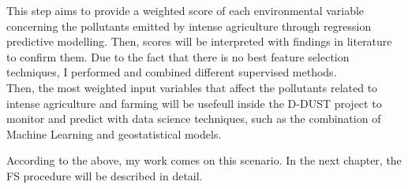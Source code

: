 \bigbreak
This step aims to provide a weighted score of each environmental variable concerning the pollutants emitted by intense agriculture through regression predictive modelling. Then, scores will be interpreted with findings in literature to confirm them.
Due to the fact that there is no best feature selection techniques, I performed and combined different supervised methods. \\
Then, the most weighted input variables that affect the pollutants related to intense agriculture and farming will be usefeull inside the D-DUST project to monitor and predict with data science techniques, such as the combination of Machine Learning and geostatistical models.
\par
According to the above, my work comes on this scenario.
In the next chapter, the FS procedure will be described in detail.
\\

